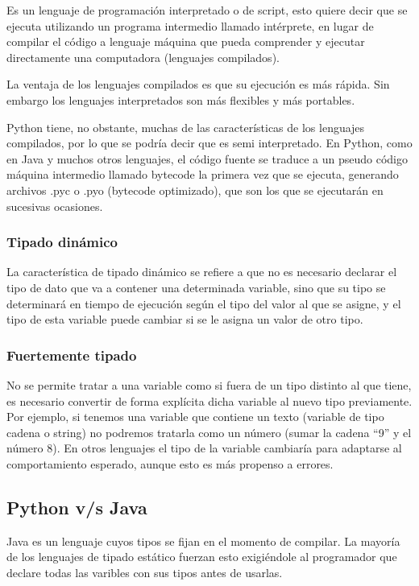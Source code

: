 \documentclass[12pt,a4paper]{report}
\begin{document}
Es un lenguaje de programación interpretado o de script, esto quiere decir que se ejecuta utilizando un programa intermedio llamado intérprete, en lugar de compilar el código a lenguaje máquina que pueda comprender y ejecutar directamente una computadora (lenguajes compilados).

La ventaja de los lenguajes compilados es que su ejecución es más rápida. Sin embargo los lenguajes interpretados son más flexibles y más portables.

Python tiene, no obstante, muchas de las características de los lenguajes compilados, por lo que se podría decir que es semi interpretado. En Python, como en Java y muchos otros lenguajes, el código fuente se
traduce a un pseudo código máquina intermedio llamado bytecode la primera vez que se ejecuta, generando archivos .pyc o .pyo (bytecode optimizado), que son los que se ejecutarán en sucesivas ocasiones.


			\subsubsection{Tipado dinámico}

La característica de tipado dinámico se refiere a que no es necesario declarar el tipo de dato que va a contener una determinada variable, sino que su tipo se determinará en tiempo de ejecución según el tipo del valor al que se asigne, y el tipo de esta variable puede cambiar si se le asigna un valor de otro tipo.


			\subsubsection{Fuertemente tipado}

No se permite tratar a una variable como si fuera de un tipo distinto al que tiene, es necesario convertir de forma explícita dicha variable al nuevo tipo previamente. Por ejemplo, si tenemos una variable que contiene un texto (variable de tipo cadena o string) no podremos tratarla como un número (sumar la cadena “9” y el número 8). En otros lenguajes el tipo de la variable cambiaría para adaptarse al comportamiento esperado, aunque esto es más propenso a errores.

		\subsection{Python v/s Java}

Java es un lenguaje cuyos tipos se fijan en el momento de compilar. La mayoría de los lenguajes de tipado estático fuerzan esto exigiéndole al programador que declare todas las varibles con sus tipos antes de usarlas. 
\end{document}

